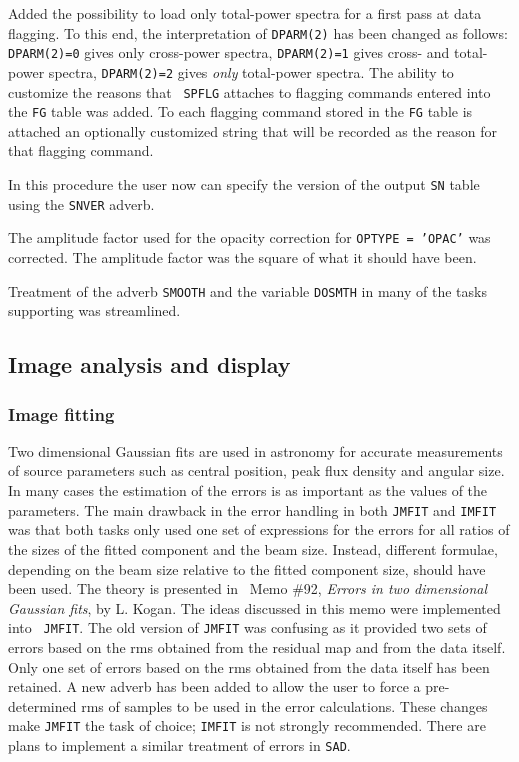 \begin{description}
 Added the possibility to load only total-power
spectra for a first pass at data flagging. To this end, the
interpretation of {\tt DPARM(2)} has been changed as follows: {\tt
DPARM(2)=0} gives only cross-power spectra, {\tt DPARM(2)=1} gives
cross- and total- power spectra, {\tt DPARM(2)=2} gives {\it only}
total-power spectra. The ability to customize the reasons that {\tt
SPFLG} attaches to flagging commands entered into the {\tt FG} table
was added. To each flagging command stored in the {\tt FG} table is
attached an optionally customized string that will be recorded as the
reason for that flagging command.

 In this procedure the user now can specify the
version of the output {\tt SN} table using the {\tt SNVER}
adverb.

 The amplitude factor used for the opacity
correction for {\tt OPTYPE = 'OPAC'} was corrected. The amplitude
factor was the square of what it should have been.

 Treatment of the adverb {\tt SMOOTH} and the
variable {\tt DOSMTH} in many of the tasks supporting was
streamlined.

\end{description}
\vskip -10pt %
\subsection{Image analysis and display}

\subsubsection{Image fitting}

Two dimensional Gaussian fits are used in astronomy for accurate
measurements of source parameters such as central position, peak flux
density and angular size. In many cases the estimation of the errors
is as important as the values of the parameters. The main drawback in
the error handling in both {\tt JMFIT} and {\tt IMFIT} was that both
tasks only used one set of expressions for the errors for all ratios
of the sizes of the fitted component and the beam size. Instead,
different formulae, depending on the beam size relative to the fitted
component size, should have been used.  The theory is presented in
\AIPS\ Memo \#92, {\it Errors in two dimensional Gaussian fits}, by
L. Kogan. The ideas discussed in this memo were implemented into {\tt
JMFIT}. The old version of {\tt JMFIT} was confusing as it provided
two sets of errors based on the rms obtained from the residual map and
from the data itself. Only one set of errors based on the rms obtained
from the data itself has been retained. A new adverb has been added to
allow the user to force a pre-determined rms of samples to be used in
the error calculations.  These changes make {\tt JMFIT} the task of
choice; {\tt IMFIT} is not strongly recommended.  There are plans to
implement a similar treatment of errors in {\tt SAD}.
\vskip -10pt %
